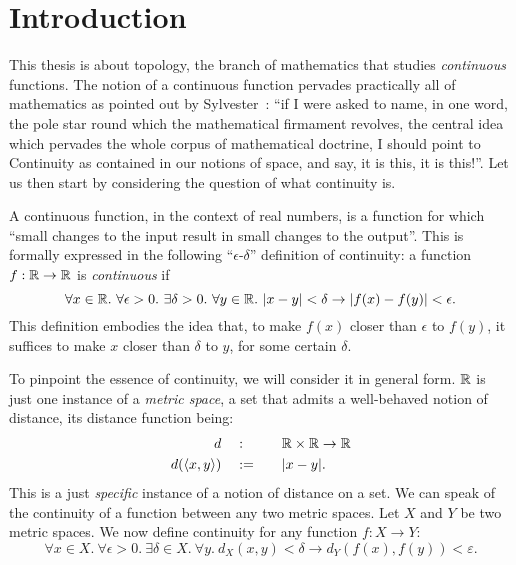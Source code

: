 \chapter{Introduction}\label{chap:intro}

This thesis is about topology, the branch of mathematics that studies \emph{continuous}
functions. The notion of a continuous function pervades practically all of mathematics as
pointed out by Sylvester~\cite[pg.~27]{armstrong-topology}: ``if I were asked to name, in
one word, the pole star round which the mathematical firmament revolves, the central idea
which pervades the whole corpus of mathematical doctrine, I should point to Continuity as
contained in our notions of space, and say, it is this, it is this!''. Let us then start
by considering the question of what continuity is.

A continuous function, in the context of real numbers, is a function for which ``small
changes to the input result in small changes to the output''. This is formally expressed
in the following ``$\epsilon$-$\delta$'' definition of continuity: a function $f : \mathbb{R}{} \rightarrow
\mathbb{R}{}$ is
\emph{continuous} if
\begin{equation*}\label{eq:cont-0}
  \forall x \in \mathbb{R}{}.~ \forall \epsilon > 0.~ \exists \delta > 0.~ \forall y \in \mathbb{R}{}.~
    | x - y | < \delta \rightarrow | f(x) - f(y) | < \epsilon.
\end{equation*}
This definition embodies the idea that, to make $f(x)$ closer than $\epsilon$ to
$f(y)$, it suffices to make $x$ closer than $\delta$ to $y$, for some certain $\delta$.

To pinpoint the essence of continuity, we will consider it in general form. $\mathbb{R}{}$ is
just one instance of a \emph{metric space}, a set that admits a well-behaved notion of
distance, its distance function being:
\begin{alignat*}{2}
  d              \quad&:\quad  && \mathbb{R}{} \times \mathbb{R}{} \rightarrow \mathbb{R}{} \\
  d(\langle x , y \rangle) \quad&:=\quad && | x - y |                      .
\end{alignat*}
This is a just \emph{specific} instance of a notion of distance on a set. We can speak of
the continuity of a function between any two metric spaces. Let $X$ and $Y$ be two metric
spaces. We now define continuity for any function $f : X \rightarrow Y$:
\begin{equation}\label{cont-1}
  \forall x \in X.~ \forall \epsilon > 0.~ \exists \delta \in X.~ \forall y.~ d_X(x, y) < δ \rightarrow d_Y(f(x), f(y)) < ε.
\end{equation}


